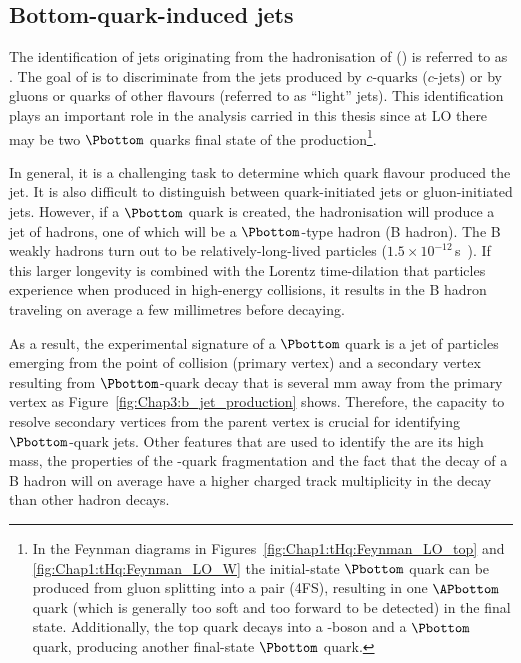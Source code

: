 
\subsection{Bottom-quark-induced jets}
\label{sec:Chap3:Reco:Bjets}
The identification of jets originating from the hadronisation of \bquarks (\bjets) is referred to as \btag. 
The goal of \btag is to discriminate \bjets from the jets produced by \ensuremath{c\text{-quarks}} (\ensuremath{c\text{-jets}}) 
or by gluons or quarks of other flavours (referred to as ``light'' jets). 
This identification plays an important role in the analysis carried in this thesis since at LO
there may be two $\Pbottom$ quarks final state of the \tHq production\footnote{In the Feynman diagrams in 
Figures~\ref{fig:Chap1:tHq:Feynman_LO_top} and \ref{fig:Chap1:tHq:Feynman_LO_W}  the
initial-state $\Pbottom$ quark can be produced from gluon splitting into a \bbbar pair (4FS), resulting
in one $\APbottom$ quark (which is generally too soft and too forward to be detected) in the final state. 
Additionally, the top quark decays into a \PW-boson and a $\Pbottom$ quark, 
producing another final-state $\Pbottom$ quark.}. 

In general, it is a challenging task to determine which quark flavour produced 
the jet. It is also difficult to distinguish between quark-initiated jets
or gluon-initiated jets.
 However, if a $\Pbottom$ quark is created, the hadronisation will produce
a jet of hadrons, one of which will be a $\Pbottom$-type hadron (B hadron). The B weakly hadrons turn out to be 
relatively-long-lived particles ($1.5 \times 10^{-12}\,$s~\cite{Workman:2022ynf}). If this larger longevity is combined with the Lorentz 
time-dilation that particles experience when produced in high-energy collisions, it results in the B hadron 
traveling on average a few millimetres before decaying.  

As a result, the experimental signature of a $\Pbottom$ quark is a jet of particles emerging from the point of
collision (primary vertex) and a secondary vertex resulting from $\Pbottom$-quark decay that is several mm 
away from the primary vertex as Figure~\ref{fig:Chap3:b_jet_production} shows. 
Therefore, the capacity to resolve secondary vertices from the parent vertex is
crucial for identifying $\Pbottom$-quark jets. Other features that are used to identify the \bjets are its high mass,
the properties of the \Pbottom-quark fragmentation and the fact that the decay of
a B hadron will on average have a higher charged track multiplicity in the decay 
than other hadron decays.

